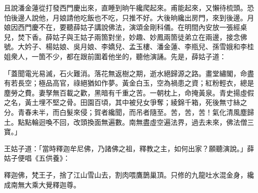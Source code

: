 且說潘金蓮從打發西門慶出來，直睡到晌午纔爬起來。甫能起來，又懶待梳頭。恐怕後邊人說他，月娘請他吃飯也不吃，只推不好。大後晌纔出房門，{}來到後邊。月娘因西門慶不在，要聽薛姑子講說佛法，演頌金剛科儀。在明間內安放一張經桌兒，焚下香。薛姑子與王姑子兩箇對坐，妙趣、妙鳳兩箇徒弟立在兩邊，接念佛號。大妗子、楊姑娘、吳月娘、李嬌兒、孟玉樓、潘金蓮、李瓶兒、孫雪娥和李桂姐衆人，一箇不少，都在跟前圍着他坐的，聽他演誦。先是，薛姑子道：

\begin{myquote}[\markfont]
「蓋聞電光易滅，石火難消。落花無返樹之期，逝水絕歸源之路。畫堂繡閣，命盡有若長空；極品高官，祿絕猶如作夢。黃金白玉，空為禍患之資；紅粉輕衣，總是塵勞之費。妻孥無百載之歡，黑暗有千重之苦。一朝枕上，命掩黃泉。青史揚虛假之名，黃土埋不堅之骨。田園百頃，其中被兒女爭奪；綾錦千箱，死後無寸絲之分。青春未半，而白髮來侵；賀者纔聞，而吊者隨至。{}苦，苦，苦！氣化清風塵歸土。點點輪迴喚不回，改頭換面無遍數。南無盡虛空遍法界，過去未來，佛法僧三寶。」

\end{myquote}

王姑子道：「當時釋迦牟尼佛，乃諸佛之祖，釋教之主，如何出家？願聽演說。」薛姑子便唱《五供養》：

\begin{myquote}[\markfont]
釋迦佛，梵王子，捨了江山雪山去，割肉喂鷹鵲巢頂。只修的九龍吐水混金身，纔成南無大乘大覺釋迦尊。
\end{myquote}

